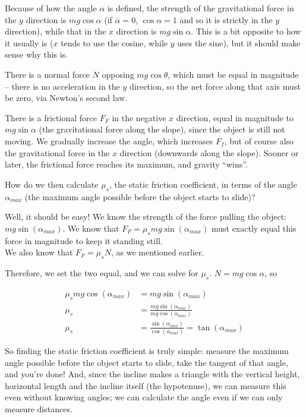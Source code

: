 Because of how the angle $\alpha$ is defined, the strength of the gravitational force in the $y$ direction is $m g \cos \alpha$ (if $\alpha = 0$, $\cos \alpha = 1$ and so it is strictly in the $y$ direction), while that in the $x$ direction is $m g \sin \alpha$. This is a bit opposite to how it usually is ($x$ tends to use the cosine, while $y$ uses the sine), but it should make sense why this is.

There is a normal force $N$ opposing $m g \cos \theta$, which must be equal in magnitude -- there is no acceleration in the $y$ direction, so the net force along that axis must be zero, via Newton's second law.

There is a frictional force $F_F$ in the negative $x$ direction, equal in magnitude to $m g \sin \alpha$ (the gravitational force along the slope), since the object is still not moving. We gradually increase the angle, which increases $F_f$, but of course also the gravitational force in the $x$ direction (downwards along the slope). Sooner or later, the frictional force reaches its maximum, and gravity ``wins''.

How do we then calculate $\mu_s$, the static friction coefficient, in terms of the angle $\alpha_{max}$ (the maximum angle possible before the object starts to slide)?

Well, it should be easy! We know the strength of the force pulling the object: $m g \sin (\alpha_{max})$. We know that $F_F = \mu_s m g \sin (\alpha_{max})$ must exactly equal this force in magnitude to keep it standing still.\\
We also know that $F_F = \mu_s N$, as we mentioned earlier.

Therefore, we set the two equal, and we can solve for $\mu_s$. $N = m g \cos \alpha$, so

\begin{align*}
\mu_s m g \cos (\alpha_{max}) &= m g \sin(\alpha_{max})\\
\mu_s &= \frac{m g \sin(\alpha_{max})}{m g \cos (\alpha_{max})}\\
\mu_s &= \frac{\sin(\alpha_{max})}{\cos (\alpha_{max})} = \tan(\alpha_{max})
\end{align*}

So finding the static friction coefficient is truly simple: measure the maximum angle possible before the object starts to slide, take the tangent of that angle, and you're done! And, since the incline makes a triangle with the vertical height, horizontal length and the incline itself (the hypotenuse), we can measure this even without knowing angles; we can calculate the angle even if we can only measure distances.

